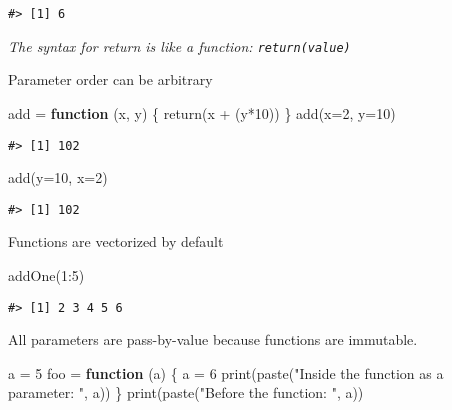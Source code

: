 \documentclass[
]{book}
\newenvironment{Shaded}{\begin{snugshade}}{\end{snugshade}}
\newcommand{\AttributeTok}[1]{\textcolor[rgb]{0.77,0.63,0.00}{#1}}
\newcommand{\ControlFlowTok}[1]{\textcolor[rgb]{0.13,0.29,0.53}{\textbf{#1}}}
\newcommand{\DecValTok}[1]{\textcolor[rgb]{0.00,0.00,0.81}{#1}}
\newcommand{\FunctionTok}[1]{\textcolor[rgb]{0.00,0.00,0.00}{#1}}
\newcommand{\NormalTok}[1]{#1}
\newcommand{\OtherTok}[1]{\textcolor[rgb]{0.56,0.35,0.01}{#1}}
\newcommand{\SpecialCharTok}[1]{\textcolor[rgb]{0.00,0.00,0.00}{#1}}
\newcommand{\StringTok}[1]{\textcolor[rgb]{0.31,0.60,0.02}{#1}}
\begin{document}
\begin{verbatim}
#> [1] 6
\end{verbatim}

\emph{The syntax for return is like a function: \texttt{return(value)}}

Parameter order can be arbitrary

\begin{Shaded}
\begin{Highlighting}[]
\NormalTok{add }\OtherTok{=} \ControlFlowTok{function}\NormalTok{ (x, y) \{}
  \FunctionTok{return}\NormalTok{(x }\SpecialCharTok{+}\NormalTok{ (y}\SpecialCharTok{*}\DecValTok{10}\NormalTok{))}
\NormalTok{\}}
\FunctionTok{add}\NormalTok{(}\AttributeTok{x=}\DecValTok{2}\NormalTok{, }\AttributeTok{y=}\DecValTok{10}\NormalTok{)}
\end{Highlighting}
\end{Shaded}

\begin{verbatim}
#> [1] 102
\end{verbatim}

\begin{Shaded}
\begin{Highlighting}[]
\FunctionTok{add}\NormalTok{(}\AttributeTok{y=}\DecValTok{10}\NormalTok{, }\AttributeTok{x=}\DecValTok{2}\NormalTok{)}
\end{Highlighting}
\end{Shaded}

\begin{verbatim}
#> [1] 102
\end{verbatim}

Functions are vectorized by default

\begin{Shaded}
\begin{Highlighting}[]
\FunctionTok{addOne}\NormalTok{(}\DecValTok{1}\SpecialCharTok{:}\DecValTok{5}\NormalTok{)}
\end{Highlighting}
\end{Shaded}

\begin{verbatim}
#> [1] 2 3 4 5 6
\end{verbatim}

All parameters are pass-by-value because functions are immutable.

\begin{Shaded}
\begin{Highlighting}[]
\NormalTok{a }\OtherTok{=} \DecValTok{5}
\NormalTok{foo }\OtherTok{=} \ControlFlowTok{function}\NormalTok{ (a) \{}
\NormalTok{  a }\OtherTok{=} \DecValTok{6}
  \FunctionTok{print}\NormalTok{(}\FunctionTok{paste}\NormalTok{(}\StringTok{"Inside the function as a parameter: "}\NormalTok{, a))}
\NormalTok{\}}
\FunctionTok{print}\NormalTok{(}\FunctionTok{paste}\NormalTok{(}\StringTok{"Before the function: "}\NormalTok{, a))}
\end{Highlighting}
\end{Shaded}
\end{document}
